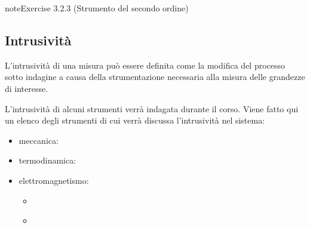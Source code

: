 \documentclass[letterpaper,10pt,italian]{jupyterBook}
\begin{document}
\begin{sphinxadmonition}{note}{Exercise 3.2.3 (Strumento del secondo ordine)}



\sphinxAtStartPar
{}
\end{sphinxadmonition}


\subsection{Intrusività}
\label{\detokenize{ch/intro/measurements:intrusivita}}\label{\detokenize{ch/intro/measurements:physics-hs-intro-measurements-instruments-intrusivity}}
\sphinxAtStartPar
L’intrusività di una misura può essere definita come la modifica del processo sotto indagine a causa della strumentazione necessaria alla misura delle grandezze di interesse.

\sphinxAtStartPar
L’intrusività di alcuni strumenti verrà indagata durante il corso. Viene fatto qui un elenco degli strumenti di cui verrà discussa l’intrusività nel sistema:
\begin{itemize}
\item {} 
\sphinxAtStartPar
meccanica:

\item {} 
\sphinxAtStartPar
termodinamica:

\item {} 
\sphinxAtStartPar
elettromagnetismo:
\begin{itemize}
\item {} 
\sphinxAtStartPar
{\hyperref[\detokenize{ch/electromagnetism/electromagnetism-steady:physics-hs-electromagnetism-electromagnetism-steady-experience-faraday-amperometer}]{}}

\item {} 
\sphinxAtStartPar
{\hyperref[\detokenize{ch/electromagnetism/electromagnetism-steady:physics-hs-electromagnetism-electromagnetism-steady-experience-faraday-voltmeter}]{}}

\end{itemize}

\end{itemize}

\sphinxstepscope
\end{document}
